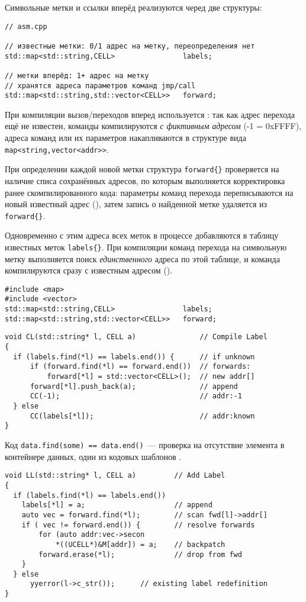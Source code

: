 \clearpage
{}

\noindent
Символьные метки и ссылки вперёд реализуются черед две структуры:
\begin{verbatim}// asm.cpp

// известные метки: 0/1 адрес на метку, переопределения нет
std::map<std::string,CELL>                labels;

// метки вперёд: 1+ адрес на метку
// хранятся адреса параметров команд jmp/call
std::map<std::string,std::vector<CELL>>   forward;
\end{verbatim}

При компиляции вызов/переходов вперед используется : так как
адрес перехода ещё не известен, команды компилируются \emph{с фиктивным адресом}
(-1 = 0xFFFF), адреса команд или их параметров накапливаются в структуре вида
\verb|map<string,vector<addr>>|.

При определении каждой новой метки структура \verb|forward{}| проверяется на
наличие списа сохранённых адресов, по которым выполняется корректировка ранее
скомпилированного кода: параметры команд перехода переписываются на новый
известный адрес (), затем запись о найденной метке удаляется
из \verb|forward{}|.

\smallskip
Одновременно с этим адреса всех меток в процессе 
добавляются в таблицу известных меток \verb|labels{}|. При компиляции команд
перехода на символьную метку выполняется поиск \emph{единственного} адреса по
этой таблице, и команда компилируются сразу с известным адресом ().


\begin{verbatim}
#include <map>
#include <vector>
std::map<std::string,CELL>                labels;
std::map<std::string,std::vector<CELL>>   forward;
\end{verbatim}
\clearpage
\begin{verbatim}
void CL(std::string* l, CELL a)               // Compile Label
{
  if (labels.find(*l) == labels.end()) {      // if unknown
      if (forward.find(*l) == forward.end())  // forwards:
          forward[*l] = std::vector<CELL>();  // new addr[]
      forward[*l].push_back(a);               // append
      CC(-1);                                 // addr:-1
  } else 
      CC(labels[*l]);                         // addr:known
}
\end{verbatim}
Код \verb|data.find(some) == data.end()|\ --- проверка на отсутствие элемента в
контейнере данных, один из кодовых шаблонов \cpp.
\clearpage
\begin{verbatim}
void LL(std::string* l, CELL a)         // Add Label
{
  if (labels.find(*l) == labels.end()) 
    labels[*l] = a;                     // append
    auto vec = forward.find(*l);        // scan fwd[l]->addr[]
    if ( vec != forward.end()) {        // resolve forwards
        for (auto addr:vec->secon
            *((UCELL*)&M[addr]) = a;    // backpatch
        forward.erase(*l);              // drop from fwd
    }
  } else
      yyerror(l->c_str());      // existing label redefinition
}
\end{verbatim}
